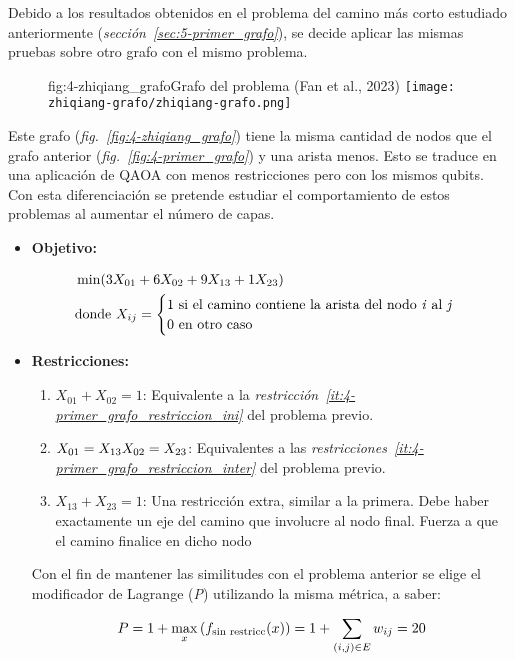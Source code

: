 Debido a los resultados obtenidos en el problema del camino más corto estudiado anteriormente (\textit{sección~\ref{sec:5-primer_grafo}}), se decide aplicar las mismas pruebas sobre otro grafo con el mismo problema.

\begin{figure}[Grafo para estudio de capas {--} camino más corto]{fig:4-zhiqiang_grafo}{Grafo del problema (Fan et al., 2023\cite{solving_shortest_path_with_qaoa})}
  \centering
  \texttt{[image: zhiqiang-grafo/zhiqiang-grafo.png]}
\end{figure}

Este grafo (\textit{fig.~\ref{fig:4-zhiqiang_grafo}}) tiene la misma cantidad de nodos que el grafo anterior (\textit{fig.~\ref{fig:4-primer_grafo}}) y una arista menos.
Esto se traduce en una aplicación de QAOA con menos restricciones pero con los mismos qubits.
\\
Con esta diferenciación se pretende estudiar el comportamiento de estos problemas al aumentar el número de capas.

\begin{itemize}
\item \textbf{Objetivo:}

  \begin{align}
    &\min(3X_{01} + 6X_{02} + 9X_{13} + 1X_{23}) \\
    &\textnormal{donde } X_{ij} = \begin{cases} \nonumber
      1 \textnormal{ si el camino contiene la arista del nodo \textit{i} al \textit{j}} \\
      0 \textnormal{ en otro caso}
    \end{cases}
  \end{align}

\item \textbf{Restricciones:}

  \begin{enumerate}
  \item $X_{01} + X_{02} = 1$: Equivalente a la \textit{restricción~\ref{it:4-primer_grafo_restriccion_ini}} del problema previo.

  \item $X_{01} = X_{13} \\
    X_{02} = X_{23}$: Equivalentes a las \textit{restricciones~\ref{it:4-primer_grafo_restriccion_inter}} del problema previo.

  \item $X_{13} + X_{23} = 1$:  Una restricción extra, similar a la primera.
    Debe haber exactamente un eje del camino que involucre al nodo final.
    Fuerza a que el camino finalice en dicho nodo

  \end{enumerate}

  Con el fin de mantener las similitudes con el problema anterior se elige el modificador de Lagrange (\textit{P}) utilizando la misma métrica, a saber:

  \begin{align}
    P = 1 + \max_{x}{(f_{\textnormal{sin restricc}}(x))} = 1 + \sum_{(i, j)\in{E}}{w_{ij}} = 20
  \end{align}

\end{itemize}

